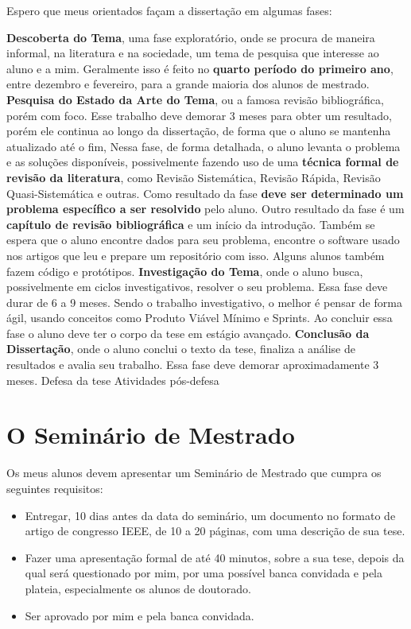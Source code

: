 \documentclass[a4paper,12pt]{report}
\begin{document}
Espero que meus orientados façam a dissertação em algumas fases:
\begin{outline}
    \1 \textbf{Descoberta do Tema}, uma fase exploratório, onde se procura de maneira informal, na literatura e na sociedade, um tema de pesquisa que interesse ao aluno e a mim.
    \2 Geralmente isso é feito no \textbf{quarto período do primeiro ano}, entre dezembro e fevereiro, para a grande maioria dos alunos de mestrado.
    \1 \textbf{Pesquisa do Estado da Arte do Tema}, ou a famosa revisão bibliográfica, porém com foco.
    \2 Esse trabalho deve demorar 3 meses para obter um resultado, porém ele continua ao longo da dissertação, de forma que o aluno se mantenha atualizado até o fim,
    \2 Nessa fase, de forma detalhada, o aluno levanta o problema e as soluções disponíveis, possivelmente fazendo uso de uma \textbf{técnica formal de revisão da literatura}, como Revisão Sistemática, Revisão Rápida, Revisão Quasi-Sistemática e outras.
    \2 Como resultado da fase \textbf{deve ser determinado um problema específico a ser resolvido} pelo aluno.
    \2 Outro resultado da fase é um \textbf{capítulo de revisão bibliográfica} e um início da introdução.
    \2 Também se espera que o aluno encontre dados para seu problema, encontre o software usado nos artigos que leu e prepare um repositório com isso.
    \2 Alguns alunos também fazem código e protótipos.
    \1 \textbf{Investigação do Tema}, onde o aluno busca, possivelmente em ciclos investigativos, resolver o seu problema.
    \2 Essa fase deve durar de 6 a 9 meses.
    \2 Sendo o trabalho investigativo, o melhor é pensar de forma ágil, usando conceitos como Produto Viável Mínimo e Sprints.
    \2 Ao concluir essa fase o aluno deve ter o corpo da tese em estágio avançado.
    \1 \textbf{Conclusão da Dissertação}, onde o aluno conclui o texto da tese, finaliza a análise de resultados e avalia seu trabalho.
    \2 Essa fase deve demorar aproximadamente 3 meses.
    \1 Defesa da tese
    \1 Atividades pós-defesa
\end{outline}




\chapter{O Seminário de Mestrado}

Os meus alunos devem apresentar um Seminário de Mestrado que cumpra os seguintes requisitos:
\begin{itemize}
    \item Entregar, 10 dias antes da data do seminário, um documento no formato de artigo de congresso IEEE, de 10 a 20 páginas, com uma descrição de sua tese.
    \item Fazer uma apresentação formal de até 40 minutos, sobre a sua tese, depois da qual será questionado por mim, por uma possível banca convidada e pela plateia, especialmente os alunos de doutorado.
    \item Ser aprovado por mim e pela banca convidada.
\end{itemize}
\end{document}
